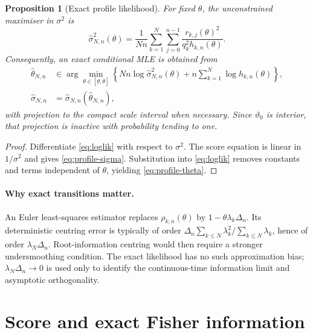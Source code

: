 \documentclass[11pt]{article}
\newtheorem{proposition}[assumption]{Proposition}
\theoremstyle{remark}
\newcommand{\1}{\mathbf 1}
\newcommand{\vzero}{\vartheta_0}
\begin{document}
\begin{proposition}[Exact profile likelihood]\label{prop:profile}
For fixed $\theta$, the unconstrained maximiser in $\sigma^2$ is
\begin{equation}\label{eq:profile-sigma}
 \widehat\sigma_{N,n}^2(\theta)
 =\frac1{Nn}\sum_{k=1}^N\sum_{j=0}^{n-1}
 \frac{r_{k,j}(\theta)^2}{q_k^2h_{k,n}(\theta)}.
\end{equation}
Consequently, an exact conditional MLE is obtained from
\begin{align}
 \widehat\theta_{N,n}
 &\in\arg\min_{\theta\in[\underline\theta,\overline\theta]}
 \left\{
 Nn\log\widehat\sigma_{N,n}^2(\theta)
 +n\sum_{k=1}^N\log h_{k,n}(\theta)
 \right\},\label{eq:profile-theta}\\
 \widehat\sigma_{N,n}
 &=\widehat\sigma_{N,n}(\widehat\theta_{N,n}),\label{eq:profile-final}
\end{align}
with projection to the compact scale interval when necessary.  Since $\vzero$ is interior, that projection is inactive with probability tending to one.
\end{proposition}

\begin{proof}
Differentiate \eqref{eq:loglik} with respect to $\sigma^2$.  The score equation is linear in $1/\sigma^2$ and gives \eqref{eq:profile-sigma}.  Substitution into \eqref{eq:loglik} removes constants and terms independent of $\theta$, yielding \eqref{eq:profile-theta}.
\end{proof}

\paragraph{Why exact transitions matter.}
An Euler least-squares estimator replaces $\rho_{k,n}(\theta)$ by $1-\theta\lambda_k\Delta_n$.  Its deterministic centring error is typically of order
$\Delta_n\sum_{k\le N}\lambda_k^2/\sum_{k\le N}\lambda_k$, hence of order $\lambda_N\Delta_n$.  Root-information centring would then require a stronger undersmoothing condition.  The exact likelihood has no such approximation bias; $\lambda_N\Delta_n\to0$ is used only to identify the continuous-time information limit and asymptotic orthogonality.

\section{Score and exact Fisher information}
\end{document}
